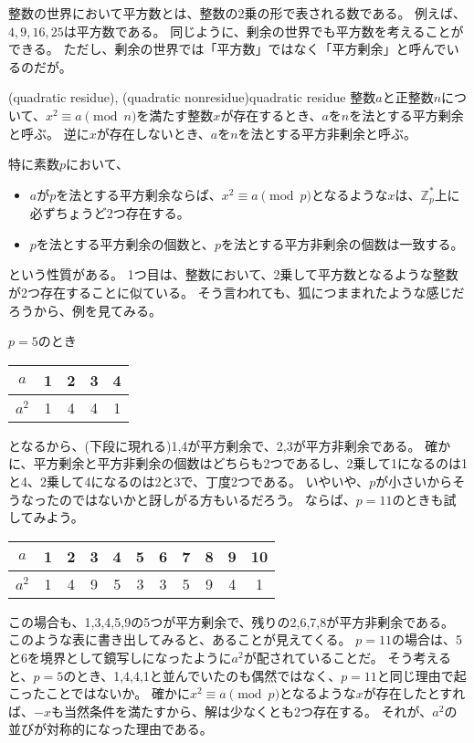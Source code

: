整数の世界において平方数とは、整数の2乗の形で表される数である。
例えば、$4, 9, 16, 25$は平方数である。
同じように、剰余の世界でも平方数を考えることができる。
ただし、剰余の世界では「平方数」ではなく「平方剰余」と呼んでいるのだが。

\begin{Defi}{(quadratic residue), (quadratic nonresidue)}{quadratic residue}
整数$a$と正整数$n$について、$x^2 \equiv a \pmod{n}$を満たす整数$x$が存在するとき、$a$を$n$を法とする平方剰余と呼ぶ。
逆に$x$が存在しないとき、$a$を$n$を法とする平方非剰余と呼ぶ。
\end{Defi}

特に素数$p$において、
\begin{itemize}
\item $a$が$p$を法とする平方剰余ならば、$x^2\equiv a\pmod{p}$となるような$x$は、$\mathbb{Z}_p^*$上に必ずちょうど2つ存在する。
\item $p$を法とする平方剰余の個数と、$p$を法とする平方非剰余の個数は一致する。
\end{itemize}
という性質がある。
1つ目は、整数において、2乗して平方数となるような整数が2つ存在することに似ている。
そう言われても、狐につままれたような感じだろうから、例を見てみる。

$p=5$のとき
\begin{table}[h]
  \begin{tabular}{|c||c|c|c|c|}\hline
    $a$ & 1 & 2 & 3 & 4 \\\hline
    $a^2$ & 1 & 4 & 4 & 1 \\\hline
  \end{tabular}
\end{table}

となるから、(下段に現れる)1,4が平方剰余で、2,3が平方非剰余である。
確かに、平方剰余と平方非剰余の個数はどちらも2つであるし、2乗して1になるのは1と4、2乗して4になるのは2と3で、丁度2つである。
いやいや、$p$が小さいからそうなったのではないかと訝しがる方もいるだろう。
ならば、$p=11$のときも試してみよう。
\begin{table}[h]
  \begin{tabular}{|c||c|c|c|c|c|c|c|c|c|c|}\hline
    $a$ & 1 & 2 & 3 & 4 & 5 & 6 & 7 & 8 & 9 & 10 \\\hline
    $a^2$ & 1 & 4 & 9 & 5 & 3 & 3 & 5 & 9 & 4 & 1 \\\hline
  \end{tabular}
\end{table}

この場合も、1,3,4,5,9の5つが平方剰余で、残りの2,6,7,8が平方非剰余である。
このような表に書き出してみると、あることが見えてくる。
$p=11$の場合は、5と6を境界として鏡写しになったように$a^2$が配されていることだ。
そう考えると、$p=5$のとき、1,4,4,1と並んでいたのも偶然ではなく、$p=11$と同じ理由で起こったことではないか。
確かに$x^2\equiv a\pmod{p}$となるような$x$が存在したとすれば、$-x$も当然条件を満たすから、解は少なくとも2つ存在する。
それが、$a^2$の並びが対称的になった理由である。

